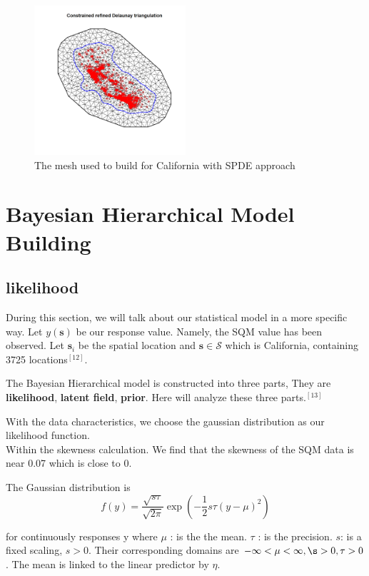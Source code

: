 \documentclass{mcmthesis}
\begin{document}
\begin{figure}[htp]
    \centering
    \includegraphics[width=0.5\textwidth]{images/mesh0.png}
    \caption{The mesh used to build for California with SPDE approach}
    \label{pre1}
\end{figure}


\section{Bayesian Hierarchical Model Building}

\subsection{likelihood}


During this section, we will talk about our statistical model in a more specific way.  Let $y(\boldsymbol{s})$ be our response value. Namely, the SQM value has been observed. Let $\boldsymbol{s}_{i}$ be the spatial location and $\boldsymbol{s} \in \mathcal{S}$ which is California, containing 3725 locations$^{[12]}$.

The Bayesian Hierarchical model is constructed into three parts, They are \textbf{likelihood}, \textbf{latent field}, \textbf{prior}. Here will analyze these three parts.$^{[13]}$

With the data characteristics, we choose the gaussian distribution as our likelihood function. \\Within the skewness calculation. We find that the skewness of the SQM data is near 0.07 which is close to 0.

The Gaussian distribution is
\begin{equation}
    f(y)=\frac{\sqrt{s \tau}}{\sqrt{2 \pi}} \exp \left(-\frac{1}{2} s \tau(y-\mu)^{2}\right)
\end{equation}

for continuously responses  y  where $\mu$  : is the the mean.  $\tau$  : is the precision.  $s$:  is a fixed scaling,  $s>0$. Their corresponding domains are $ -\infty<\mu<\infty, \s>0, \tau>0$.  The mean is linked to the linear predictor by $\eta$. 
\end{document}
